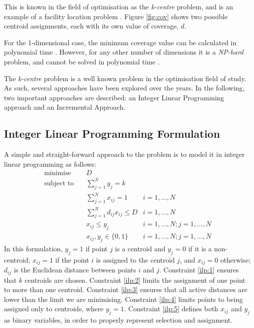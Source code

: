 This is known in the field of optimisation as the \emph{k-centre} problem, and is an example of a facility location problem \cite{thisfref}. Figure \ref{fig:cov} shows two possible centroid assignments, each with its own value of coverage, $d$.



For the 1-dimensional case, the minimum coverage value can be calculated in polynomial time \cite{dvaz}. However, for any other number of dimensions it is a \emph{NP-hard} problem, and cannot be solved in polynomial time \cite{complex}.

The \emph{k-centre} problem is a well known problem in the optimisation field of study. As such, several approaches have been explored over the years. In the following, two important approaches are described: an Integer Linear Programming approach and an Incremental Approach.

\subsection{Integer Linear Programming Formulation}
\label{alg:ilp}

A simple and straight-forward approach to the problem is to model it in  integer linear programming as follows:
\begin{align}
\text{minimise}   \quad& D				   &\\
\text{subject to} \quad
& \sum\limits_{j=1}^{N}{y_j} = k 
& 							\label{ilp:1}\\
& \sum\limits_{j=1}^{N}{x_{ij}}	= 1   
& i=1,\ldots,N 				\label{ilp:2}\\
& \sum\limits_{j=1}^{N}{d_{ij} x_{ij}} \leq D
& i=1,\ldots,N				\label{ilp:3}\\
& x_{ij} \leq y_{j}				   
& i=1,\ldots,N;j=1,\ldots,N	\label{ilp:4}\\
& x_{ij},y_{j} \in \{0,1\}
& i=1,\ldots,N;j=1,\ldots,N \label{ilp:5}
\end{align}
In this formulation, $y_j = 1$ if point $j$ is a centroid and $y_j = 0$ if it is a non-centroid;
$x_{ij} = 1$ if the point $i$ is assigned to the centroid $j$, and $x_{ij}=0$ otherwise;
$d_{ij}$ is the Euclidean distance between points $i$ and $j$.
Constraint \eqref{ilp:1} ensures that $k$ centroids are chosen.
Constraint \eqref{ilp:2} limits the assignment of one point to more than one centroid.
Constraint \eqref{ilp:3} ensures that all active distances are lower than the limit we are minimising.
Constraint \eqref{ilp:4} limits points to being assigned only to centroids, where $y_j=1$.
Constraint \eqref{ilp:5} defines both $x_{ij}$ and $y_j$ as binary variables, in order to properly represent selection and assignment.

